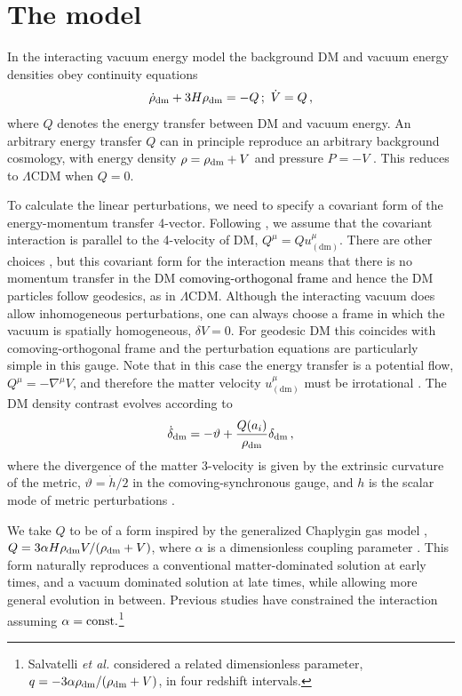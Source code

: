 \documentclass[prd,twocolumn,preprintnumbers,amsmath,amssymb,nofootinbib,english,showpacs]{revtex4-1}
\newcommand{\tc}{\textcolor{black}}
\newcommand{\dww}{\textcolor{black}}
\newcommand{\dw}{}
\def\etal{{\frenchspacing\it et al.}}
\def\ba{\begin{eqnarray}}
\def\ea{\end{eqnarray}}
\begin{document}
\section{The model}

In the interacting vacuum energy model the background DM and vacuum energy densities obey continuity equations
\ba
\label{rhodmdot} \dot{\rho}_{\rm \tc{dm}}+3H\rho_{\rm \tc{dm}} = -Q \,; \ \dot{V} = Q \,,
\label{Vdot}
\ea
where $Q$ denotes the energy transfer between DM and vacuum energy.
\dw{An arbitrary energy transfer $Q$ can in principle reproduce an arbitrary background cosmology, with energy density $\rho=\rho_{\rm \tc{dm}}+V$ and pressure $P=-V$ \cite{Wands:2012Mar}. This reduces to $\Lambda$CDM when $Q=0$.}

To calculate the linear perturbations, we need to specify a covariant form of the energy-momentum transfer 4-vector. Following \cite{Wang:2013Jan, Wang:2014Apr}, we assume that the covariant interaction is parallel to the 4-velocity of DM, $Q^{\mu} = {Q}u^{\mu}_{(\mathrm{dm})}$. There are other choices \cite{Wands:2012Mar}, but this covariant form for the interaction means that there is no momentum transfer in the DM \dww{comoving-orthogonal frame} and hence the DM particles follow geodesics, as in $\Lambda$CDM. Although the interacting vacuum does allow inhomogeneous perturbations, one can always choose a frame in which the vacuum is spatially homogeneous, $\delta V=0$. For geodesic DM this coincides with comoving-orthogonal frame \cite{Wang:2013Jan, Wang:2014Apr} and the perturbation equations are particularly simple in this gauge. Note that in this case the energy transfer is a potential flow, $Q^\mu = -\nabla^\mu V$, and therefore the matter velocity $u^{\mu}_{(\mathrm{dm})}$ must be irrotational \cite{Sawicki:2013wja}. The DM density contrast evolves according to
\begin{eqnarray}
 \label{dmenergy}
 \dot{\delta}_{\rm \tc{dm}}=-\vartheta+\frac{Q(a_i)}{\rho_{\rm \tc{dm}}}\delta_{\rm \tc{dm}} \,,
\end{eqnarray}
where the divergence of the matter 3-velocity is given by the extrinsic curvature of the metric, $\vartheta=\dot{h}/2$ in the comoving-synchronous gauge, and $h$ is the scalar mode of metric perturbations \cite{Ma:1995Jun}.

We take $Q$ to be of a form inspired by the generalized Chaplygin gas model \cite{Kamenshchik:2001cp,Bento:2002ps}, $Q = 3\alpha H \rho_{\rm \tc{dm}} V / (\rho_{\rm \tc{dm}} +V)$, where $\alpha$ is a dimensionless coupling parameter \cite{Wands:2012Mar}. This form naturally reproduces a conventional matter-dominated solution at early times, and a vacuum dominated solution at late times, while allowing more general evolution in between. Previous studies \cite{Wang:2013Jan, Wang:2014Apr} have constrained the interaction assuming $\alpha = {\rm const.}$\footnote{Salvatelli \etal \cite{Salvatelli:2014Jun} considered a related dimensionless parameter, $q=-3\alpha\rho_{\rm \tc{dm}}/(\rho_{\rm \tc{dm}} +V)$, in four redshift intervals.}
\end{document}
